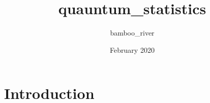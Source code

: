 \documentclass{article}
\title{quauntum_statistics}
\author{bamboo_river }
\date{February 2020}
\begin{document}
\maketitle

\section{Introduction}
\end{document}
